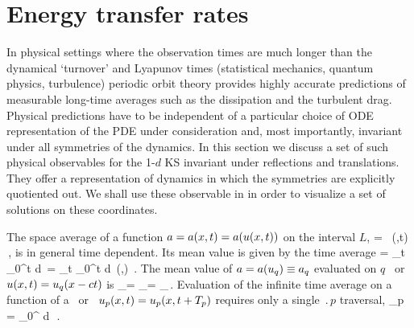 


\section{Energy transfer rates}
\label{sec:energy}

In physical settings where the observation times are much longer than
the dynamical `turnover' and Lyapunov times (statistical mechanics,
quantum physics, turbulence) periodic orbit theory provides
highly accurate predictions of measurable long-time averages such as
the dissipation and the turbulent drag. Physical predictions have to be
independent of a particular choice of ODE representation of the PDE
under consideration and, most importantly, invariant under all
symmetries of the dynamics. In this section we discuss a set of such
physical observables for the  1-$d$ KS invariant under reflections and
translations. They offer a representation of dynamics in which the
symmetries are explicitly quotiented out. We shall use these observable in
 in order to visualize a set of solutions on
these coordinates.

The {space average} of a function $a = a(x,t) = a(u(x,t))$  on
the interval $L$,
\beq
    \expct{\obser} = \Lint{\pSpace}\, \obser(\pSpace,t)
    \,,
    \label{rpo:spac_ave}
\eeq
is in general time dependent.
Its mean value is given by the {time average}
\beq
\timeAver{\obser}
    =
\lim_{t\rightarrow \infty}  \int_0^t \! d\tau \, \expct{\obser}
    =
\lim_{t\rightarrow \infty}  \int_0^t \!
    \Lint{\tau}  d\pSpace\, \obser(\pSpace,\tau)
    \,.
\label{rpo:tim_ave}
\eeq
The mean value of $a = a(u_q) \equiv a_q$ evaluated on $q$
\eqv\ or {\reqv} $u(x,t) = u_q(x-ct)$ is
\beq
\timeAver{\obser}_\stagn = \expct{\obser}_\stagn = \obser_\stagn\,.
\label{rpo:u-eqv} \eeq Evaluation of the infinite time average
 on a function of a \po\ or \rpo\
$u_p(x,t)=u_p(x,t+{T_{p}})$ requires only a single
$\period{p}$ traversal,
\beq
  \timeAver{\obser}_p = 
    \int_0^{\period{p}} \! d\tau \, \expct{\obser}
\,.
\label{rpo:u-cyc}
\eeq

